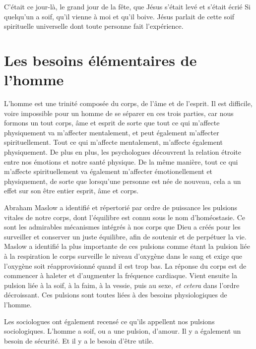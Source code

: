 C'était ce jour-là, le grand jour de la fête, que Jésus s'était levé
 et s'était écrié\frcolon{}
 \Og Si quelqu'un a soif, qu'il vienne à moi et qu'il boive. \Fg{}
 Jésus parlait de cette soif spirituelle universelle dont toute personne fait l'expérience.


\section{Les besoins \'el\'ementaires de l'homme}


L'homme est une trinité composée du corps, de l'âme et de l'esprit.
 Il est difficile, voire impossible pour un homme de se séparer
 en ces trois parties, car nous formons un tout
 \ocadr corps, âme et esprit \fcadr{} de sorte
 que tout ce qui m'affecte
 physiquement va m'affecter mentalement, et peut également m'affecter
 spirituellement. Tout ce qui m'affecte mentalement, m'affecte
 également physiquement.
 De plus en plus, les psychologues découvrent la relation étroite
 entre nos émotions et notre santé physique.
 De la même manière, tout ce qui m'affecte spirituellement
 va également m'affecter émotionellement et physiquement,
 de sorte que lorsqu'une personne est née de nouveau,
 cela a un effet sur son être entier\frcolon{} esprit, âme et corps.

Abraham Maslow a identifié et répertorié par ordre de puissance
 les pulsions vitales de notre corps, dont l'équilibre est connu sous le nom d'homéo\-stasie.
 Ce sont les admirables mécanismes intégrés à nos corps que Dieu
 a créés pour les surveiller et conserver un juste équilibre,
 afin de soutenir et de perpétuer la vie.
 Maslow a identifié la plus importante de ces pulsions comme étant
 la pulsion liée à la respiration\frcolon{} le corps surveille le niveau d'oxygène dans le sang
 et exige que l'oxygène soit réapprovisionné quand il est trop bas.
 La réponse du corps est de commencer à haleter et d'augmenter la fréquence cardiaque.
 Vient ensuite la pulsion liée à la soif, à la faim, à la vessie,
 puis au sexe, \emph{et cetera} dans l'ordre décroissant.
 Ces pulsions sont toutes liées à des besoins physiologiques de l'homme.

Les sociologues ont également recensé ce qu'ils appellent nos pulsions
 sociologiques. L'homme a soif, ou a une pulsion, d'amour.
 Il y a également un besoin de sécurité. Et il y a le besoin d'être utile.


